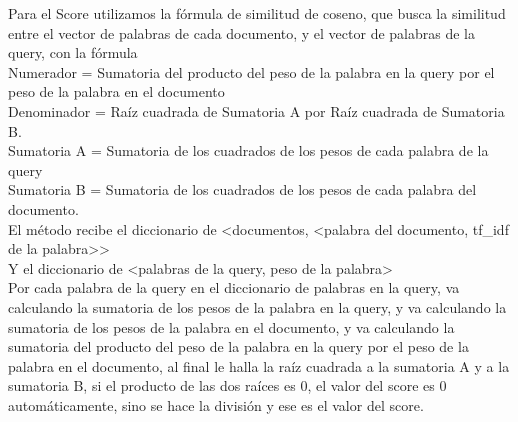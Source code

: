 \documentclass[12pt, a4paper]{article}
\begin{document}
\begin{enumerate}
\begin{itemize}
                    Para el Score utilizamos la fórmula de similitud de coseno, que busca la similitud
                    entre el vector de palabras de cada documento, y el vector de palabras de la query,
                    con la fórmula\\
                    Numerador = Sumatoria del producto del peso de la palabra en la query por el peso de
                    la palabra en el documento\\
                    Denominador = Raíz cuadrada de Sumatoria A por Raíz cuadrada de Sumatoria B.\\
                    Sumatoria A = Sumatoria de los cuadrados de los pesos de cada palabra de la query\\
                    Sumatoria B = Sumatoria de los cuadrados de los pesos de cada palabra del documento.\\
                    El método recibe el diccionario de <documentos, <palabra del documento, tf\_idf de la palabra>>\\
                    Y el diccionario de <palabras de la query, peso de la palabra>\\
                    Por cada palabra de la query en el diccionario de palabras en la query,
                    va calculando la sumatoria de los pesos de la palabra en la query,
                    y va calculando la sumatoria de los pesos de la palabra en el documento, y
                    va calculando la sumatoria del producto del peso de la palabra en la query por
                    el peso de la palabra en el documento, al final le halla la raíz cuadrada a
                    la sumatoria A y a la sumatoria B, si el producto de las dos raíces es 0,
                    el valor del score es 0 automáticamente, sino se hace la división y
                    ese es el valor del score.



\end{itemize}
\end{enumerate}
\end{document}
